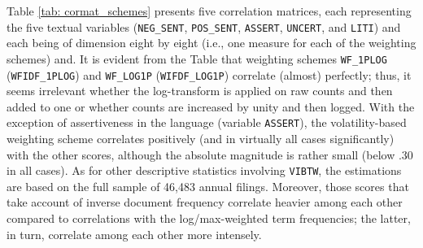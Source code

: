 Table \ref{tab: cormat_schemes} presents five correlation matrices, each representing the five textual variables (\texttt{NEG\_SENT}, \texttt{POS\_SENT}, \texttt{ASSERT}, \texttt{UNCERT}, and \texttt{LITI}) and each being of dimension eight by eight (i.e., one measure for each of the weighting schemes) and. It is evident from the Table that weighting schemes \texttt{WF\_1PLOG} (\texttt{WFIDF\_1PLOG}) and \texttt{WF\_LOG1P}  (\texttt{WIFDF\_LOG1P}) correlate (almost) perfectly; thus, it seems irrelevant whether the log-transform is applied on raw counts and then added to one or whether counts are increased by unity and then logged. With the exception of assertiveness in the language (variable \texttt{ASSERT}), the volatility-based weighting scheme correlates positively (and in virtually all cases significantly) with the other scores, although the absolute magnitude is rather small (below .30 in all cases). As for other descriptive statistics involving \texttt{VIBTW}, the estimations are based on the full sample of 46,483 annual filings. Moreover, those scores that take account of inverse document frequency correlate heavier among each other compared to correlations with the log/max-weighted term frequencies; the latter, in turn, correlate among each other more intensely.

